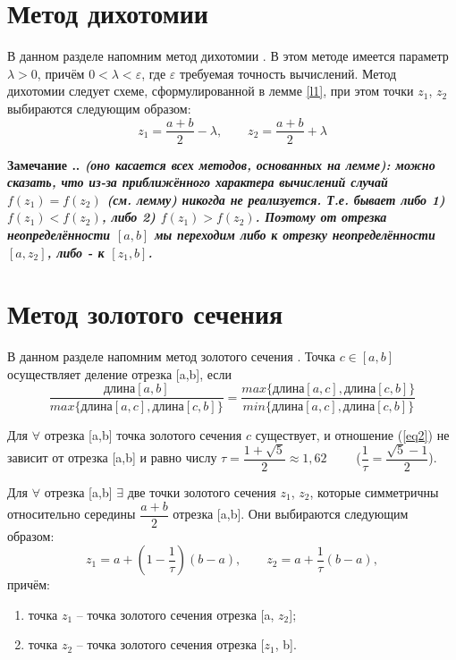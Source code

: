 \documentclass[12pt,a4paper,oneside]{report}
\newcounter{rem}[section]
\renewcommand{\therem}{\thesection.\arabic{rem}}
\newenvironment{Remark}{\par\refstepcounter{rem} \bf Замечание \therem. \sl}{\rm\par}
\begin{document}
\section{Метод дихотомии}
В данном разделе напомним метод дихотомии \cite[гл.1, пар.3]{Vasil'ev}.
В этом методе имеется параметр $\lambda>0$, причём $0<\lambda<\varepsilon$, где $\varepsilon$ требуемая точность вычислений.
Метод дихотомии следует схеме, сформулированной в лемме \ref{l1}, при этом точки $z_1$, $z_2$ выбираются следующим образом:    
\begin{equation}
z_1=\dfrac{a+b}{2}-\lambda,\qquad z_2=\dfrac{a+b}{2} + \lambda
\end{equation}
\begin{Remark}{\textbf{(оно касается всех методов, основанных на лемме):}}\label{}
можно сказать, что из-за приближённого характера вычислений случай $f(z_1)=f(z_2)$ (см. лемму) никогда не реализуется.
Т.е. бывает либо 1) $f(z_1)<f(z_2)$, либо 2) $f(z_1)>f(z_2)$.
Поэтому от отрезка неопределённости $[a,b]$ мы переходим либо к отрезку неопределённости $[a,z_2]$, либо - к $[z_1,b]$.
\end{Remark}

\section{Метод золотого сечения}
В данном разделе напомним метод золотого сечения \cite[гл.1, пар.4]{Vasil'ev}.
Точка $c \in [a,b]$ осуществляет деление отрезка [a,b], если 
\begin{equation}\label{eq2}
\dfrac{\text{длина}[a,b]}{max\{\text{длина}[a,c], \text{длина}[c,b]\}} = \dfrac{max\{\text{длина}[a,c], \text{длина}[c,b]\}}{min\{\text{длина}[a,c], \text{длина}[c,b]\}}
\end{equation}

Для $\forall$ отрезка [a,b] точка золотого сечения $c$ существует, и отношение (\ref{eq2}) не зависит от отрезка [a,b] и равно числу $\tau = \dfrac{1+\sqrt{5}}{2} \approx 1,62 \qquad$
($\dfrac{1}{\tau}=\dfrac{\sqrt{5}-1}{2}$).

Для $\forall$ отрезка [a,b] $\exists$ две точки золотого сечения $z_1$, $z_2$, которые симметричны относительно середины $\dfrac{a+b}{2}$ отрезка [a,b]. Они выбираются следующим образом:
\begin{equation}
z_1=a+(1-\dfrac{1}{\tau})(b-a),\qquad z_2=a+\dfrac{1}{\tau}(b-a),
\end{equation}
причём:
\begin{enumerate}
\item точка $z_1$ -- точка золотого сечения отрезка [a, $z_2$];
\item точка $z_2$ -- точка золотого сечения отрезка [$z_1$, b].
\end{enumerate}
\end{document}
